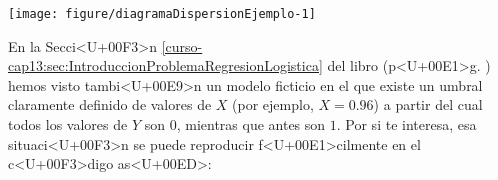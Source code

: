 \documentclass[10pt,a4paper]{article}
\begin{document}
{\small
\begin{knitrout}
\color{fgcolor}\begin{kframe}
\begin{alltt}
 \hlkwb{=} \hlstd{()}
\hlstd{colores[datos}\hlopt{$} \hlopt{==} \hlstd{]} \hlkwb{=} 
\hlstd{colores[datos}\hlopt{$} \hlopt{==} \hlstd{]} \hlkwb{=} 
\hlopt{$}\hlopt{$}  \hlstd{=} \hlstd{,}   \hlstd{=}\hlstd{,}\hlstd{=}\hlstd{,}
      \hlstd{=} \hlstd{,}  \hlstd{=} \hlstd{,} \hlstd{=}\hlstd{, )}
\hlstd{(}\hlstd{,} \hlstd{(}\hlstd{,} \hlstd{),}  \hlstd{=} \hlstd{,}
        \hlstd{=}  \hlstd{(}\hlstd{,} \hlstd{))}
\hlstd{(}\hlstd{=}\hlstd{)}
\end{alltt}
\end{kframe}

{\centering \texttt{[image: figure/diagramaDispersionEjemplo-1]} 

}



\end{knitrout}
}

En la Secci<U+00F3>n \ref{curso-cap13:sec:IntroduccionProblemaRegresionLogistica} del libro (p<U+00E1>g. \pageref{curso-cap13:sec:IntroduccionProblemaRegresionLogistica})
hemos visto tambi<U+00E9>n un modelo ficticio en el que existe un umbral claramente definido de valores de $X$ (por ejemplo, $X=0.96$) a partir del cual todos los valores de $Y$ son $0$, mientras que antes son $1$. Por si te interesa, esa situaci<U+00F3>n se puede reproducir f<U+00E1>cilmente en el c<U+00F3>digo as<U+00ED>:
\end{document}
